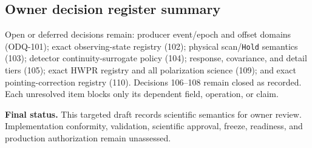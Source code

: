 \documentclass[10pt]{article}
\newcommand{\code}[1]{\nolinkurl{#1}}
\newcommand{\statusbox}[1]{\par\smallskip\noindent\colorbox{aligngray}{\parbox{0.96\linewidth}{#1}}\par\smallskip}
\begin{document}
\subsection*{Owner decision register summary}
Open or deferred decisions remain: producer event/epoch and offset domains
(ODQ-101); exact observing-state registry (102); physical scan/\code{Hold}
semantics (103); detector continuity-surrogate policy (104); response,
covariance, and detail tiers (105); exact HWPR registry and all polarization
science (109); and exact pointing-correction registry (110).  Decisions
106--108 remain closed as recorded.  Each unresolved item blocks only its
dependent field, operation, or claim.

\statusbox{\textbf{Final status.} This targeted draft records scientific
semantics for owner review.  Implementation conformity, validation, scientific
approval, freeze, readiness, and production authorization remain unassessed.}
\end{document}
